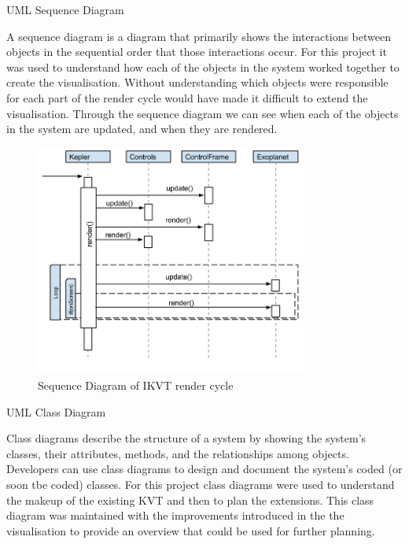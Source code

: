 \begin{enumerate}
\clearpage
{\bf \item UML Sequence Diagram}
  A sequence diagram is a diagram that primarily shows the interactions between
objects in the sequential order that those interactions occur.
For this project it was used to understand how each of the objects in the system
worked together to create the visualisation. Without understanding which objects
were responsible for each part of the render cycle would have made it difficult
to extend the visualisation. Through the sequence diagram we can see when each
of the objects in the system are updated, and when they are rendered. 
   \begin{figure}[H]
  \centering
      \includegraphics[width=0.8\textwidth]{images/sequence.png}
  \caption{Sequence Diagram of IKVT render cycle}  
    \label{fig:sequenceDiagram}
\end{figure}
\clearpage
 {\bf \item UML Class Diagram}
 Class diagrams describe the structure of a system by showing the system's
classes, their attributes, methods, and the relationships among objects.
 Developers can use class diagrams to design and document the system's coded (or
soon tbe coded) classes. For this project class diagrams were used to understand
the makeup of the existing KVT and then to plan the extensions. This class
diagram was maintained with the improvements introduced in the the visualisation
to provide an overview that could be used for further planning.
 \begin{figure}[H]
  \centering

\end{figure}
\end{enumerate}
